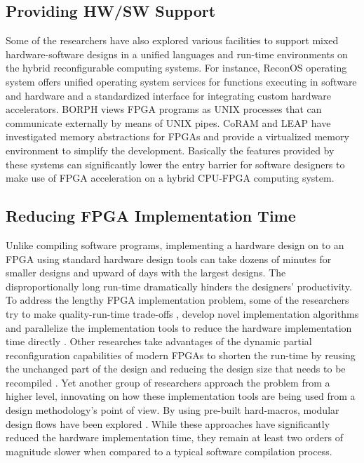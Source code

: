 \subsection{Providing HW/SW Support}
Some of the researchers have also explored various facilities to support mixed hardware-software designs in a unified languages and run-time environments \cite{so2008unified, lubbers2009ReconOS, fleming2014leap, chung2011coram, andrews2008achieving, agron2009domain} on the hybrid reconfigurable computing systems. For instance, ReconOS operating system \cite{lubbers2009ReconOS} offers unified operating system services for functions executing in software and hardware and a standardized interface for integrating custom hardware accelerators. BORPH \cite{so2008unified} views FPGA programs as UNIX processes that can communicate externally by means of UNIX pipes. CoRAM and LEAP \cite{chung2011coram, fleming2014leap} have investigated memory abstractions for FPGAs and provide a virtualized memory environment to simplify the development. Basically the features provided by these systems can significantly lower the entry barrier for software designers to make use of FPGA acceleration on a hybrid CPU-FPGA computing system. 

\subsection{Reducing FPGA Implementation Time}
Unlike compiling software programs, implementing a hardware design on to an FPGA using standard hardware design tools can take dozens of minutes for smaller designs and upward of days with the largest designs. The disproportionally long run-time dramatically hinders the designers' productivity. To address the lengthy FPGA implementation problem, some of the researchers try to make quality-run-time trade-offs \cite{mulpuri2001runtime, sankar1999trading}, develop novel implementation algorithms\cite{wrighton2003hardware, tessier2002fast, maidee2003fast} and parallelize the implementation tools to reduce the hardware implementation time directly \cite{moctar2014parallel, goeders2011deterministic, altera-pc, xilinx-pc}. Other researches take advantages of the dynamic partial reconfiguration capabilities of modern FPGAs to shorten the run-time by reusing the unchanged part of the design and reducing the design size that needs to be recompiled \cite{frangieh2010PATIS, kao2005benefits, horta2002dynamic, beckhoff2012go}. Yet another group of researchers approach the problem from a higher level, innovating on how these implementation tools are being used from a design methodology's point of view. By using pre-built hard-macros, modular design flows have been explored \cite{lavin2013improving, korf2011automatic, lavin2011HMFlow, lavin2013impact}. While these approaches have significantly reduced the hardware implementation time, they remain at least two orders of magnitude slower when compared to a typical software compilation process.

